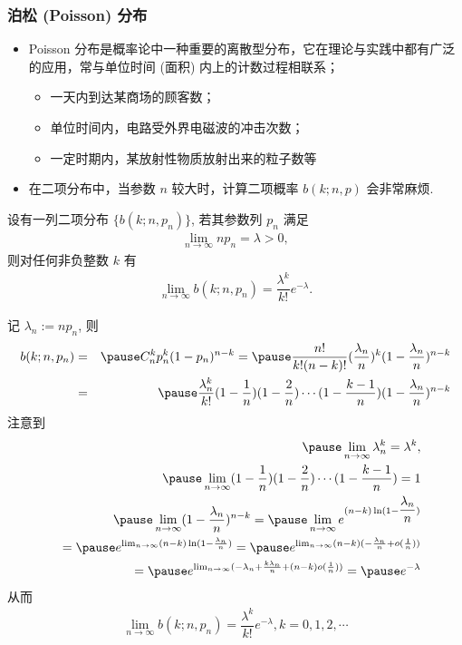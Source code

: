\begin{frame}
	\frametitle{泊松 (Poisson) 分布}
	\begin{itemize}[<+-|alert@+>]
		\item Poisson 分布是概率论中一种重要的离散型分布，它在理论与实践中都有广泛的应用，常与单位时间 (面积) 内上的计数过程相联系；
		      \begin{itemize}
			      \item 一天内到达某商场的顾客数；
			      \item 单位时间内，电路受外界电磁波的冲击次数；
			      \item 一定时期内，某放射性物质放射出来的粒子数等
		      \end{itemize}
		\item 在二项分布中，当参数 $n$ 较大时，计算二项概率 $b (k;n,p)$ 会非常麻烦.
	\end{itemize}
	\pause  \begin{thm}
		设有一列二项分布 $\{b (k;n,p_n)\}$, 若其参数列 $p_n$ 满足
		\begin{eqnarray*}
			\lim_{n\rightarrow \infty}np_n=\lambda>0,
		\end{eqnarray*}
		则对任何非负整数 $k$ 有
		\begin{eqnarray*}
			\lim_{n\rightarrow \infty}b(k;n,p_n)=\dfrac{\lambda^k}{k!}e^{-\lambda}.
		\end{eqnarray*}
	\end{thm}
\end{frame}
\begin{frame}

	\vspace{0.4cm}
	\zheng 记 $\lambda_n:=np_n$, 则
	\begin{eqnarray*}
		b(k;n,p_n)&=&\pause C_n^kp_n^k(1-p_n)^{n-k}=\pause \dfrac{n!}{k!(n-k)!}(\dfrac{\lambda_n}{n})^k(1-\dfrac{\lambda_n}{n})^{n-k}\\
		&=&\pause \dfrac{\lambda_n^k}{k!}(1-\dfrac{1}{n})(1-\dfrac{2}{n})\cdots(1-\dfrac{k-1}{n})(1-\dfrac{\lambda_n}{n})^{n-k}
	\end{eqnarray*}
	\pause 注意到
	\begin{eqnarray*}
		&&\pause \lim_{n\rightarrow\infty}\lambda_n^k=\lambda^k, \\
		&&\pause \lim_{n\rightarrow\infty}(1-\dfrac{1}{n})(1-\dfrac{2}{n})\cdots(1-\dfrac{k-1}{n})=1\\
		&&\pause \lim_{n\rightarrow\infty}(1-\dfrac{\lambda_n}{n})^{n-k}=\pause \lim_{n\rightarrow\infty}e^{(n-k)\ln(1-\dfrac{\lambda_n}{n})}\\
		&&=\pause e^{\lim_{n\rightarrow\infty}(n-k)\ln(1-\frac{\lambda_n}{n})}=\pause e^{\lim_{n\rightarrow\infty}(n-k)(-\frac{\lambda_n}{n}+o(\frac{1}{n}))}\\
		&&=\pause e^{\lim_{n\rightarrow\infty}(-\lambda_n+\frac{k\lambda_n}{n}+(n-k)o(\frac{1}{n}))}=\pause e^{-\lambda}
	\end{eqnarray*}
	\pause 从而 \vspace{-0.8cm}
	\begin{eqnarray*}
		\lim_{n\rightarrow\infty}b(k;n,p_n)=\dfrac{\lambda^k}{k!}e^{-\lambda}, k=0, 1, 2,\cdots
	\end{eqnarray*}

\end{frame}
